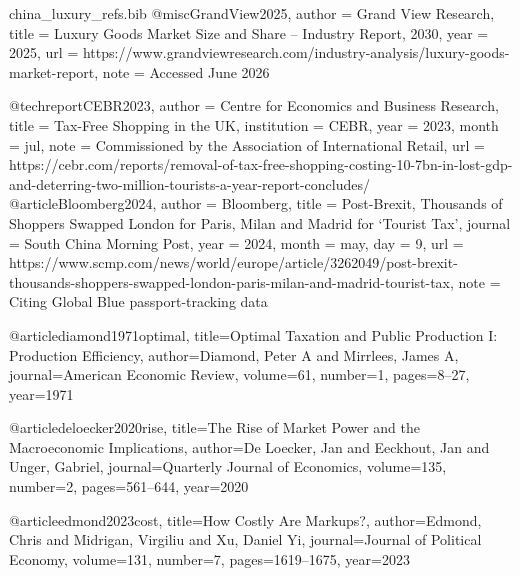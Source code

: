 \begin{filecontents}{china_luxury_refs.bib}
@misc{GrandView2025,
  author       = {{Grand View Research}},
  title        = {Luxury Goods Market Size and Share -- Industry Report, 2030},
  year         = {2025},
  url          = {https://www.grandviewresearch.com/industry-analysis/luxury-goods-market-report},
  note         = {Accessed June 2026}
}


@techreport{CEBR2023,
  author      = {{Centre for Economics and Business Research}},
  title       = {Tax-Free Shopping in the {UK}},
  institution = {CEBR},
  year        = {2023},
  month       = jul,
  note        = {Commissioned by the Association of International Retail},
  url         = {https://cebr.com/reports/removal-of-tax-free-shopping-costing-10-7bn-in-lost-gdp-and-deterring-two-million-tourists-a-year-report-concludes/}
}
@article{Bloomberg2024,
  author  = {{Bloomberg}},
  title   = {Post-{B}rexit, Thousands of Shoppers Swapped {L}ondon for {P}aris,
             {M}ilan and {M}adrid for `Tourist Tax'},
  journal = {South China Morning Post},
  year    = {2024},
  month   = may,
  day     = {9},
  url     = {https://www.scmp.com/news/world/europe/article/3262049/post-brexit-thousands-shoppers-swapped-london-paris-milan-and-madrid-tourist-tax},
  note    = {Citing Global Blue passport-tracking data}
}

@article{diamond1971optimal,
  title={Optimal Taxation and Public Production {I}: 
         Production Efficiency},
  author={Diamond, Peter A and Mirrlees, James A},
  journal={American Economic Review},
  volume={61},
  number={1},
  pages={8--27},
  year={1971}
}

@article{deloecker2020rise,
  title={The Rise of Market Power and the Macroeconomic 
         Implications},
  author={{De Loecker}, Jan and Eeckhout, Jan and Unger, Gabriel},
  journal={Quarterly Journal of Economics},
  volume={135},
  number={2},
  pages={561--644},
  year={2020}
}

@article{edmond2023cost,
  title={How Costly Are Markups?},
  author={Edmond, Chris and Midrigan, Virgiliu and Xu, Daniel Yi},
  journal={Journal of Political Economy},
  volume={131},
  number={7},
  pages={1619--1675},
  year={2023}
}


\end{filecontents}
